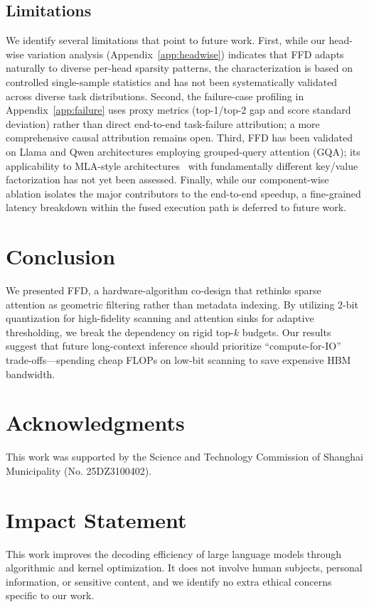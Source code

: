 \documentclass[]{mosi}
\theoremstyle{plain}
\theoremstyle{definition}
\theoremstyle{remark}
\begin{document}
\subsection{Limitations}
We identify several limitations that point to future work. First, while our head-wise variation analysis (Appendix~\ref{app:headwise}) indicates that FFD adapts naturally to diverse per-head sparsity patterns, the characterization is based on controlled single-sample statistics and has not been systematically validated across diverse task distributions. Second, the failure-case profiling in Appendix~\ref{app:failure} uses proxy metrics (top-1/top-2 gap and score standard deviation) rather than direct end-to-end task-failure attribution; a more comprehensive causal attribution remains open. Third, FFD has been validated on Llama and Qwen architectures employing grouped-query attention (GQA); its applicability to MLA-style architectures~\citep{liu2025deepseek} with fundamentally different key/value factorization has not yet been assessed. Finally, while our component-wise ablation isolates the major contributors to the end-to-end speedup, a fine-grained latency breakdown within the fused execution path is deferred to future work.









\section{Conclusion}

We presented FFD, a hardware-algorithm co-design that rethinks sparse attention as geometric filtering rather than metadata indexing. By utilizing 2-bit quantization for high-fidelity scanning and attention sinks for adaptive thresholding, we break the dependency on rigid top-$k$ budgets. Our results suggest that future long-context inference should prioritize ``compute-for-IO'' trade-offs---spending cheap FLOPs on low-bit scanning to save expensive HBM bandwidth.

\section*{Acknowledgments}
This work was supported by the Science and Technology Commission of Shanghai Municipality (No. 25DZ3100402).

\section*{Impact Statement}
This work improves the decoding efficiency of large language models through algorithmic and kernel optimization. It does not involve human subjects, personal information, or sensitive content, and we identify no extra ethical concerns specific to our work.
\end{document}
